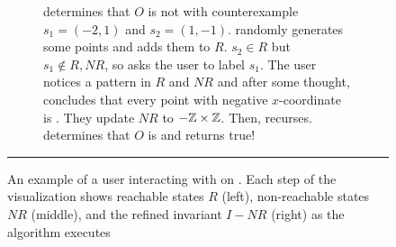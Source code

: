 \begin{figure*}[ht]
\begin{subfigure}[t]{0.58\textwidth}
\hspace{\tikzhspace}
    \hspace{\tikzhspace}
    \caption{%
      \Helper{} determines that $O$ is not  with
      counterexample $s_1 = (-2, 1)$ and $s_2 = (1, -1)$. \Helper{} randomly
      generates some \sTIreachable{} points and adds them to $R$. $s_2 \in R$
      but $s_1 \notin R, NR$, so \Helper{} asks the user to label $s_1$. The
      user notices a pattern in $R$ and $NR$ and after some thought, concludes
      that every point with negative $x$-coordinate is \sTIunreachable{}.
      They update $NR$ to $-\mathbb{Z} \times \mathbb{Z}$. Then, \Helper{} recurses.
      \Helper{} determines that $O$ is  and returns true!
    }
  \end{subfigure}

  \vspace{1em}
  \hrule
  \vspace{1em}

  \caption{%
    An example of a user interacting with
     on .  Each step of
    the visualization shows reachable states $R$ (left), non-reachable states
    $NR$ (middle), and the refined invariant $I - NR$ (right) as the algorithm
    executes
  }
\end{figure*}
